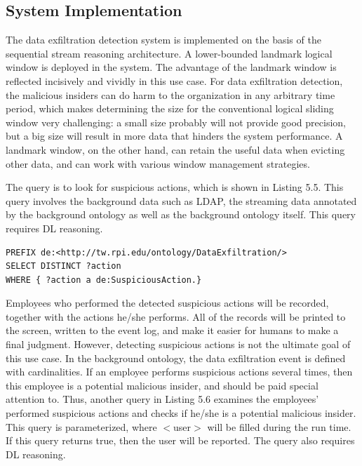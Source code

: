 \subsection{System Implementation}
The data exfiltration detection system is implemented on the basis of the sequential stream reasoning architecture. 
A lower-bounded landmark logical window is deployed in the system. 
The advantage of the landmark window is reflected incisively and vividly in this use case. 
For data exfiltration detection, the malicious insiders can do harm to the organization in any arbitrary time period, which makes determining the size for the conventional logical sliding window very challenging: a small size probably will not provide good precision, but a big size will result in more data that hinders the system performance. 
A landmark window, on the other hand, can retain the useful data when evicting other data, and can work with various window management strategies. 

The query is to look for suspicious actions, which is shown in Listing 5.5. 
This query involves the background data such as LDAP, the streaming data annotated by the background ontology as well as the background ontology itself.
This query requires DL reasoning. 

\begin{lstlisting}[language=SPARQL,caption={Suspicious Action Query},basicstyle=\small, frame=single]
PREFIX de:<http://tw.rpi.edu/ontology/DataExfiltration/>
SELECT DISTINCT ?action 
WHERE { ?action a de:SuspiciousAction.}
\end{lstlisting}

Employees who performed the detected suspicious actions will be recorded, together with the actions he/she performs. 
All of the records will be printed to the screen, written to the event log, and make it easier for humans to make a final judgment. 
However, detecting suspicious actions is not the ultimate goal of this use case.
In the background ontology, the data exfiltration event is defined with cardinalities.
If an employee performs suspicious actions several times, then this employee is a potential malicious insider, and should be paid special attention to. 
Thus, another query in Listing 5.6 examines the employees' performed suspicious actions and checks if he/she is a potential malicious insider. 
This query is parameterized, where $<$user$>$ will be filled during the run time. 
If this query returns true, then the user will be reported. 
The query also requires DL reasoning. 

